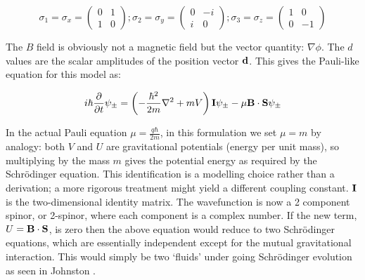 
\begin{equation}
\sigma_1 = \sigma_x =
\begin{pmatrix}
0&1\\
1&0
\end{pmatrix};
\sigma_2 = \sigma_y =
\begin{pmatrix}
0&-i\\
i&0
\end{pmatrix};
\sigma_3 = \sigma_z =
\begin{pmatrix}
1&0\\
0&-1
\end{pmatrix}
\end{equation}

\vspace*{0.5cm}

\noindent The $B$ field is obviously not a magnetic field but the vector quantity: $\nabla \phi$. The $d$ values are the scalar amplitudes of the position vector ${\bf d}$. This gives the Pauli-like equation for this model as:

\begin{equation}
i\hbar\frac{\partial}{\partial t}\psi_\pm = \left( -\frac{\hbar^2}{2m} \nabla^2 + mV \right) {\bf I} \psi_\pm -\mu {\bf B}  \cdot {\bf S} \psi_\pm
\end{equation}

\noindent In the actual Pauli equation $\mu = \frac{q \hbar}{2m}$, in this formulation we set $\mu = m$ by analogy: both $V$ and $U$ are gravitational potentials (energy per unit mass), so multiplying by the mass $m$ gives the potential energy as required by the Schr\"odinger equation. This identification is a modelling choice rather than a derivation; a more rigorous treatment might yield a different coupling constant. ${\bf I}$ is the two-dimensional identity matrix. The wavefunction is now a 2 component spinor, or 2-spinor, where each component is a complex number. If the new term, $U = {\bf B} \cdot {\bf S}$, is zero then the above equation would reduce to two Schr\"odinger equations, which are essentially independent except for the mutual gravitational interaction. This would simply be two `fluids' under going Schr\"odinger evolution as seen in Johnston \citep{bib_rj}.

